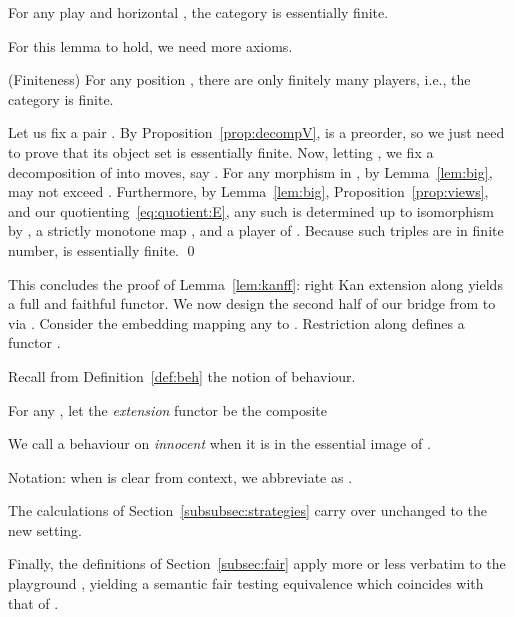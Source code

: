 \documentclass{LMCS}
\theoremstyle{plain}\newtheorem{satz}[thm]{Satz}
\begin{document}
\begin{lem}\label{lem:kanexists}
  For any play  and horizontal , the category  is
  essentially finite.
\end{lem}

For this lemma to hold, we need more axioms.
\begin{ax}
  \begin{axioms}
  \item (Finiteness) For any position , there are only finitely
    many players, i.e., the category  is finite. \label{finiteness}
\end{axioms}
\end{ax}


 Let us fix a pair . By
Proposition~\ref{prop:decompV},  is a preorder, so we just
need to prove that its object set is essentially finite.  Now, letting
, we fix a decomposition of  into moves, say . For any morphism  in
, by Lemma~\ref{lem:big},  may not exceed .  Furthermore, by
Lemma~\ref{lem:big}, Proposition~\ref{prop:views}, and our
quotienting~\eqref{eq:quotient:E}, any such  is determined up
to isomorphism by , a strictly monotone map , and
a player  of . Because such triples  are in finite number,
 is essentially finite. \qed







  This concludes the proof of Lemma~\ref{lem:kanff}: right
  Kan extension along 
  yields a full and faithful functor. We now design the second half of
  our bridge from  to  via . Consider the
  embedding  mapping any  to . Restriction along  defines a functor
  .

Recall from Definition~\ref{def:beh} the notion of behaviour.
\begin{defi}
  For any , let the \emph{extension} functor  be the composite 
  
  We call a behaviour on  \emph{innocent} when it is in the
  essential image of .
\end{defi}
Notation: when  is clear from context, we abbreviate  as .

\begin{rem}
  The calculations of Section~\ref{subsubsec:strategies} carry over
  unchanged to the new setting.
\end{rem}
Finally, the definitions of Section~\ref{subsec:fair} apply more or
less verbatim to the playground , yielding a semantic fair
testing equivalence which coincides with that of .
\end{document}
